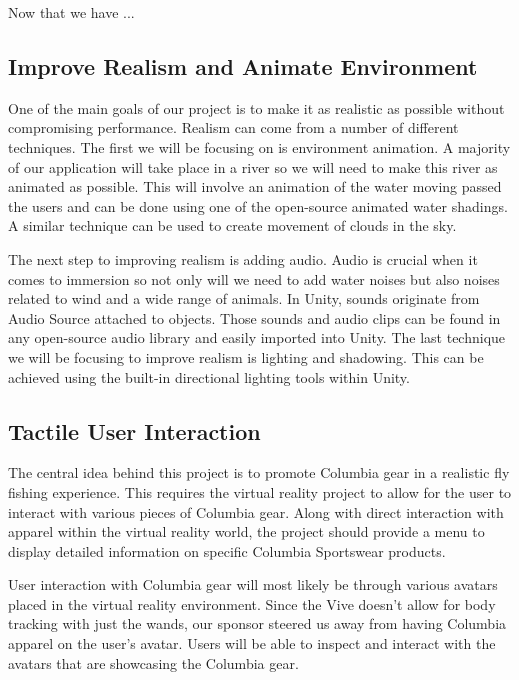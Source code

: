 \documentclass[10pt,journal,compsoc,onecolumn, draftclsnofoot]{IEEEtran}
\begin{document}
Now that we have ...

\subsection{Improve Realism and Animate Environment}
One of the main goals of our project is to make it as realistic as possible
without compromising performance. Realism can come from a number of different
techniques. The first we will be focusing on is environment animation. A
majority of our application will take place in a river so we will need to make
this river as animated as possible. This will involve an animation of the
water moving passed the users and can be done using one of the open-source
animated water shadings. A similar technique can be used to create movement of
clouds in the sky.

The next step to improving realism is adding audio. Audio is crucial when it
comes to immersion so not only will we need to add water noises but also noises
related to wind and a wide range of animals. In Unity, sounds originate from
Audio Source attached to objects. Those sounds and audio clips can be found in
any open-source audio library and easily imported into Unity. The last
technique we will be focusing to improve realism is lighting and shadowing.
This can be achieved using the built-in directional lighting tools within Unity.

\subsection{Tactile User Interaction}
The central idea behind this project is to promote Columbia gear in a realistic fly fishing experience. This requires the virtual reality project to allow for the user to interact with various pieces of Columbia gear. Along with direct interaction with apparel within the virtual reality world, the project should provide a menu to display detailed information on specific Columbia Sportswear products.

User interaction with Columbia gear will most likely be through various avatars placed in the virtual reality environment. Since the Vive doesn't allow for body tracking with just the wands, our sponsor steered us away from having Columbia apparel on the user's avatar. Users will be able to inspect and interact with the avatars that are showcasing the Columbia gear.
\end{document}
